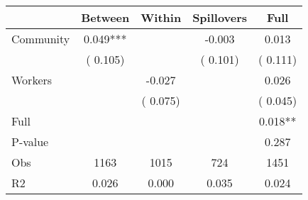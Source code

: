 
\begin{tabular}{l*{4}{c}}\hline&\multicolumn{1}{c}{Between}&\multicolumn{1}{c}{Within}&\multicolumn{1}{c}{Spillovers}&\multicolumn{1}{c}{Full}\\ \hline
 Community             &              0.049***      &                                               &       -0.003 &         0.013                            \\ 
                               &        (       0.105)           &                                       &       (       0.101)     &      (       0.111)                                           \\ 
 Workers       &                                               &       -0.027    &                                &             0.026                            \\ 
                               &                                               & (       0.075)                  &                                        &      (       0.045)                                           \\ 
\hline                                                                                                                                                                                                                                            
 Full                  &                                               &                                               &                                        &             0.018**                                     \\ 
 P-value               &                                               &                                               &                                        &             0.287                                           \\ 
 Obs                   &               1163               &       1015                       &       724                &              1451                                               \\ 
 R2                    &                      0.026              &              0.000                      &              0.035               &                     0.024                                              \\ 
\hline \end{tabular}                                                                                                                                                                                                              